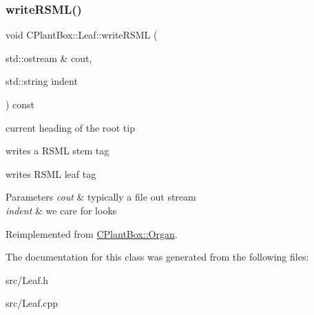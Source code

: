 \mbox{\label{classCPlantBox_1_1Leaf_a0b5fbb524de825790da55551a212d4a0}} 
\subsubsection{\texorpdfstring{write\+R\+S\+M\+L()}{writeRSML()}}
{\footnotesize\ttfamily void C\+Plant\+Box\+::\+Leaf\+::write\+R\+S\+ML (\begin{DoxyParamCaption}\item[{std\+::ostream \&}]{cout,  }\item[{std\+::string}]{indent }\end{DoxyParamCaption}) const\hspace{0.3cm}{\ttfamily [virtual]}}



current heading of the root tip 

writes a R\+S\+ML stem tag

writes R\+S\+ML leaf tag


\begin{DoxyParams}{Parameters}
{\em cout} & typically a file out stream \\
\hline
{\em indent} & we care for looks \\
\hline
\end{DoxyParams}


Reimplemented from \hyperlink{classCPlantBox_1_1Organ_acdad546c90e915b61ac3606f1f841ba1}{C\+Plant\+Box\+::\+Organ}.



The documentation for this class was generated from the following files\+:\begin{DoxyCompactItemize}
\item 
src/Leaf.\+h\item 
src/Leaf.\+cpp\end{DoxyCompactItemize}
